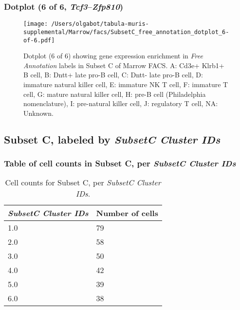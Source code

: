 \clearpage

\subsubsection{Dotplot (6 of 6, \emph{Tcf3}--\emph{Zfp810})}
\begin{figure}[h]
\centering
\texttt{[image: /Users/olgabot/tabula-muris-supplemental/Marrow/facs/SubsetC\_free\_annotation\_dotplot\_6-of-6.pdf]}

\caption{ Dotplot (6 of 6)  showing gene expression enrichment in \emph{Free Annotation} labels in Subset C of Marrow FACS. A: Cd3e+ Klrb1+ B cell, B: Dntt+ late pro-B cell, C: Dntt- late pro-B cell, D: immature natural killer cell, E: immature NK T cell, F: immature T cell, G: mature natural killer cell, H: pre-B cell (Philadelphia nomenclature), I: pre-natural killer cell, J: regulatory T cell, NA: Unknown.}
\end{figure}


\clearpage

\subsection{Subset C, labeled by \emph{SubsetC Cluster IDs}}
\subsubsection{Table of cell counts in Subset C, per \emph{SubsetC Cluster IDs}}\begin{table}[h]
\centering
\label{my-label}
\begin{tabular}{@{}ll@{}}
\toprule

\emph{SubsetC Cluster IDs}& Number of cells \\ \midrule
1.0 & 79 \\

2.0 & 58 \\

3.0 & 50 \\

4.0 & 42 \\

5.0 & 39 \\

6.0 & 38 \\
\bottomrule
\end{tabular}
\caption{Cell counts for Subset C, per \emph{SubsetC Cluster IDs}.}
\end{table}

\clearpage

